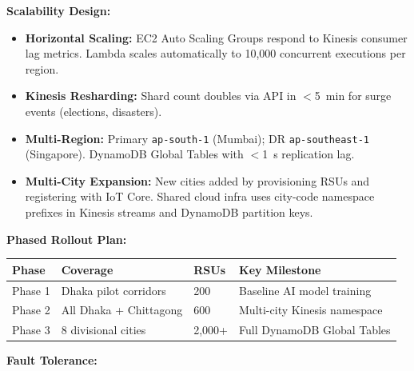 \documentclass[11pt,a4paper]{article}
\begin{document}
\noindent\textbf{Scalability Design:}

\begin{itemize}
  \item \textbf{Horizontal Scaling:} EC2 Auto Scaling Groups respond to Kinesis consumer lag metrics. Lambda scales automatically to 10,000 concurrent executions per region.
  \item \textbf{Kinesis Resharding:} Shard count doubles via API in $<$5~min for surge events (elections, disasters).
  \item \textbf{Multi-Region:} Primary \texttt{ap-south-1} (Mumbai); DR \texttt{ap-southeast-1} (Singapore). DynamoDB Global Tables with $<$1~s replication lag.
  \item \textbf{Multi-City Expansion:} New cities added by provisioning RSUs and registering with IoT Core. Shared cloud infra uses city-code namespace prefixes in Kinesis streams and DynamoDB partition keys.
\end{itemize}

\vspace{3pt}
\noindent\textbf{Phased Rollout Plan:}

\renewcommand{\arraystretch}{1.2}
\begin{center}
\begin{tabular}{|L{1.8cm}|L{3cm}|L{3cm}|L{3.5cm}|}
\hline
\textbf{Phase} & \textbf{Coverage} & \textbf{RSUs} & \textbf{Key Milestone} \\
\hline
Phase 1 & Dhaka pilot corridors & 200 & Baseline AI model training \\
\hline
Phase 2 & All Dhaka + Chittagong & 600 & Multi-city Kinesis namespace \\
\hline
Phase 3 & 8 divisional cities & 2,000+ & Full DynamoDB Global Tables \\
\hline
\end{tabular}
\end{center}

\vspace{3pt}
\noindent\textbf{Fault Tolerance:}
\end{document}
